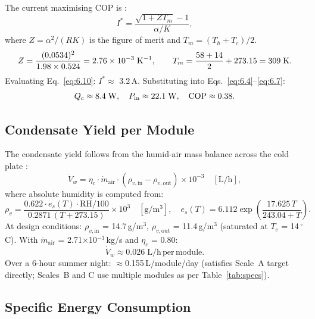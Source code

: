 \documentclass[12pt,a4paper]{report}
\numberwithin{equation}{chapter}
\numberwithin{figure}{chapter}
\numberwithin{table}{chapter}
\newcommand{\degC}{$^\circ$C}
\begin{document}
The current maximising COP is \cite{luo2022tecmodel}:
\begin{equation}
  I^* = \frac{\sqrt{1 + ZT_m} - 1}{\alpha/K},
  \label{eq:6.10}
\end{equation}
where $Z = \alpha^2/(RK)$ is the figure of merit and $T_m = (T_h + T_c)/2$.
\begin{gather*}
  Z = \frac{(0.0534)^2}{1.98 \times 0.524}
    = 2.76 \times 10^{-3}\;\mathrm{K^{-1}}, \qquad
  T_m = \frac{58 + 14}{2} + 273.15 = 309\;\mathrm{K}.
\end{gather*}
Evaluating Eq.~\eqref{eq:6.10}: $I^* \approx$ 3.2\,A. Substituting into
Eqs.~\eqref{eq:6.4}--\eqref{eq:6.7}:
\begin{equation*}
  Q_c \approx 8.4\;\mathrm{W}, \quad
  P_\mathrm{in} \approx 22.1\;\mathrm{W}, \quad
  \mathrm{COP} \approx 0.38.
\end{equation*}

\subsection{Condensate Yield per Module}

The condensate yield follows from the humid-air mass balance across the cold plate
\cite{eslami2021tec,shourideh2021tec}:
\begin{equation}
  \dot{V}_w = \eta_c \cdot \dot{m}_\mathrm{air} \cdot
  (\rho_{v,\mathrm{in}} - \rho_{v,\mathrm{out}}) \times 10^{-3} \quad\mathrm{[L/h]},
  \label{eq:6.11}
\end{equation}
where absolute humidity is computed from:
\begin{equation}
  \rho_v = \frac{0.622 \cdot e_s(T) \cdot \mathrm{RH}/100}
           {0.2871\,(T + 273.15)} \times 10^3 \quad\mathrm{[g/m^3]},
  \quad e_s(T) = 6.112\exp\!\left(\frac{17.625\,T}{243.04+T}\right).
  \label{eq:6.12}
\end{equation}
At design conditions: $\rho_{v,\mathrm{in}}$ = 14.7\,g/m$^3$,
$\rho_{v,\mathrm{out}}$ = 11.4\,g/m$^3$ (saturated at $T_c$ = 14\,\degC).
With $\dot{m}_\mathrm{air}$ = 2.71$\times$10$^{-3}$\,kg/s and $\eta_c$ = 0.80:
\begin{equation*}
  \dot{V}_w \approx 0.026\;\mathrm{L/h\,per\,module}.
\end{equation*}
Over a 6-hour summer night: $\approx$0.155\,L/module/day (satisfies Scale~A target
directly; Scales~B and C use multiple modules as per Table~\ref{tab:specs}).

\subsection{Specific Energy Consumption}
\end{document}
